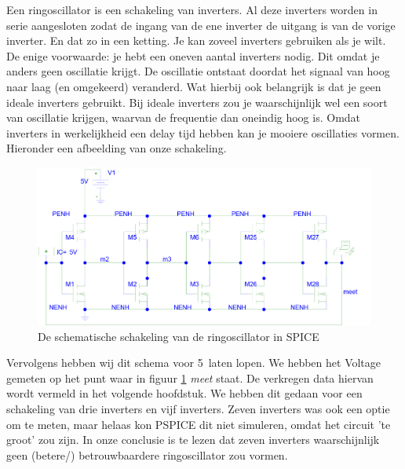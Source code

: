 \documentclass{scrartcl}  %
\begin{document}
Een ringoscillator is een schakeling van inverters. Al deze inverters worden in serie aangesloten zodat de ingang van de ene inverter de uitgang is van de vorige inverter. En dat zo in een ketting. Je kan zoveel inverters gebruiken als je wilt. De enige voorwaarde: je hebt een oneven aantal inverters nodig. Dit omdat je anders geen oscillatie krijgt. De oscillatie ontstaat doordat het signaal van hoog naar laag (en omgekeerd) veranderd. Wat hierbij ook belangrijk is dat je geen ideale inverters gebruikt. Bij ideale inverters zou je waarschijnlijk wel een soort van oscillatie krijgen, waarvan de frequentie dan oneindig hoog is. Omdat inverters in werkelijkheid een delay tijd hebben kan je mooiere oscillaties vormen. Hieronder een afbeelding van onze schakeling.
\begin{figure}[H]
\centering
        \includegraphics[width=\linewidth]{images/ringoscillator2.png}
        \caption{De schematische schakeling van de ringoscillator in SPICE}
        \label{fig:schema}
\end{figure}
Vervolgens hebben wij dit schema voor 5\nano\second\  laten lopen. We hebben het Voltage gemeten op het punt waar in figuur \ref{fig:schema} {\it meet} staat. De verkregen data hiervan wordt vermeld in het volgende hoofdstuk. We hebben dit gedaan voor een schakeling van drie inverters en vijf inverters. Zeven inverters was ook een optie om te meten, maar helaas kon PSPICE dit niet simuleren, omdat het circuit 'te groot' zou zijn. In onze conclusie is te lezen dat zeven inverters waarschijnlijk geen (betere/) betrouwbaardere ringoscillator zou vormen.
\end{document}
